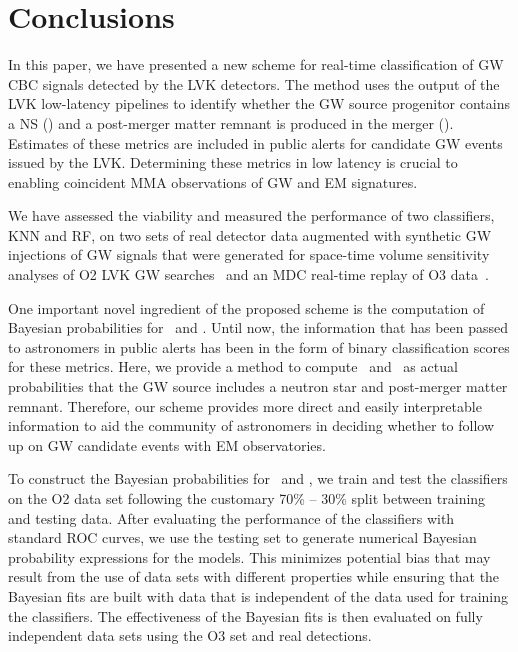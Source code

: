\section{Conclusions\label{conclusions}}

In this paper, we have presented a new scheme for real-time classification of \ac{GW} \ac{CBC} signals detected by the \ac{LVK} detectors. The method uses the output of the \ac{LVK}
low-latency pipelines to identify whether the GW source progenitor contains a \ac{NS} (\hasns) and a post-merger matter remnant is produced in the merger (\hasrem). Estimates of these
metrics are included in public alerts for candidate \ac{GW} events issued by the \ac{LVK}. Determining these metrics in low latency is crucial to enabling coincident \ac{MMA} observations
of GW and \ac{EM} signatures.

We have assessed the viability and measured the performance of two classifiers, \ac{KNN} and \ac{RF}, on two sets of real detector data augmented with synthetic GW injections of GW
signals that were generated for space-time volume sensitivity analyses of \ac{O2} \ac{LVK} \ac{GW} searches~\cite{Chatterjee:2019avs} and an \ac{MDC} real-time replay of \ac{O3}
data~\cite{Chaudhary:2023vec}. 


One important novel ingredient of the proposed scheme is the computation of Bayesian probabilities for \hasns\ and \hasrem. Until now, the information that has been passed to astronomers
in public alerts has been in the form of binary classification scores for these metrics. Here, we provide a method to compute \hasns\ and \hasrem\ as actual probabilities that the \ac{GW}
source includes a neutron star and post-merger matter remnant. Therefore, our scheme provides more direct and easily interpretable information to aid the community of astronomers in
deciding whether to follow up on \ac{GW} candidate events with \ac{EM} observatories.

To construct the Bayesian probabilities for \hasns\ and \hasrem, we train and test the classifiers on the \ac{O2} data set following the customary 70\% -- 30\% split between training and
testing data. After evaluating the performance of the classifiers with standard \ac{ROC} curves, we use the testing set to generate numerical Bayesian probability expressions for the
models. This minimizes potential bias that may result from the use of data sets with different properties while ensuring that the Bayesian fits are built with data that is independent of the data used for training the classifiers. The effectiveness of the Bayesian fits is then evaluated on fully independent data sets using the \ac{O3} set and real detections. 

